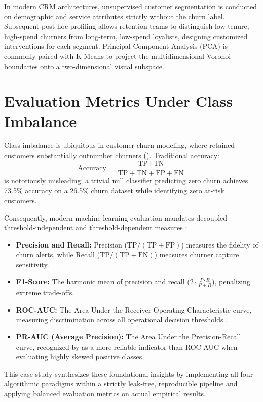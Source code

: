 In modern CRM architectures, unsupervised customer segmentation is conducted on demographic and service attributes strictly without the churn label. Subsequent post-hoc profiling allows retention teams to distinguish low-tenure, high-spend churners from long-term, low-spend loyalists, designing customized interventions for each segment. Principal Component Analysis (PCA) is commonly paired with K-Means to project the multidimensional Voronoi boundaries onto a two-dimensional visual subspace.

\section{Evaluation Metrics Under Class Imbalance}
Class imbalance is ubiquitous in customer churn modeling, where retained customers substantially outnumber churners (\citet{chawla2002smote}). Traditional accuracy:
\begin{equation}
    \text{Accuracy} = \frac{\text{TP} + \text{TN}}{\text{TP} + \text{TN} + \text{FP} + \text{FN}}
\end{equation}
is notoriously misleading; a trivial null classifier predicting zero churn achieves 73.5\% accuracy on a 26.5\% churn dataset while identifying zero at-risk customers. 

Consequently, modern machine learning evaluation mandates decoupled threshold-independent and threshold-dependent measures \citep{fawcett2006introduction, davis2006relationship}:
\begin{itemize}
    \item \textbf{Precision and Recall:} Precision ($\text{TP} / (\text{TP} + \text{FP})$) measures the fidelity of churn alerts, while Recall ($\text{TP} / (\text{TP} + \text{FN})$) measures churner capture sensitivity.
    \item \textbf{F1-Score:} The harmonic mean of precision and recall ($2 \cdot \frac{P \cdot R}{P + R}$), penalizing extreme trade-offs.
    \item \textbf{ROC-AUC:} The Area Under the Receiver Operating Characteristic curve, measuring discrimination across all operational decision thresholds \citep{fawcett2006introduction}.
    \item \textbf{PR-AUC (Average Precision):} The Area Under the Precision-Recall curve, recognized by \citet{davis2006relationship} as a more reliable indicator than ROC-AUC when evaluating highly skewed positive classes.
\end{itemize}

This case study synthesizes these foundational insights by implementing all four algorithmic paradigms within a strictly leak-free, reproducible pipeline and applying balanced evaluation metrics on actual empirical results.

